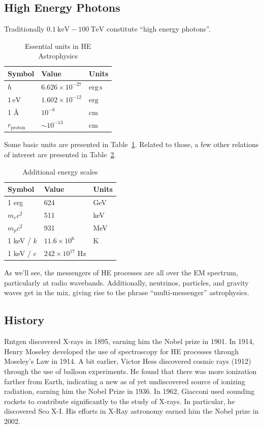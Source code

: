 \documentclass[10pt]{article}
\numberwithin{equation}{section}
\begin{document}
	
	\subsection{High Energy Photons} %
	\label{sub:high_energy_photons}
		Traditionally  $0.1\ \mathrm{keV} - 100\ \mathrm{TeV}$ constitute ``high energy photons''.
		\begin{table}[b]
			\centering
			\begin{tabular}{l l l}
				Symbol & Value & Units\\
				\hline
				$h$ & $6.626\times 10^{-27}$ & $\mathrm{erg\,s}$\\
				$1\,\mathrm{eV}$ & $1.602\times 10^{-12}$ & $\mathrm{erg}$\\
				1 \AA & $10^{-8}$ & cm\\
				$r_{\mathrm{proton}}$ & $\sim 10^{-13}$ & cm
			\end{tabular}
			\caption{Essential units in HE Astrophysics}
			\label{tab:1}
		\end{table}
		Some basic units are presented in Table~\ref{tab:1}. Related to those, a few other relations of interest are presented in Table~\ref{tab:2}.
		\begin{table}[b]
			\centering
			\begin{tabular}{l l l}
				Symbol & Value & Units\\
				\hline
				1 erg & 624 & GeV\\
				$m_ec^2$ & 511 & keV\\
				$m_pc^2$ & 931 & MeV\\
				1 keV / $k$ & $11.6\times 10^6$ & K\\
				1 keV / $c$ & $242\times 10^{17}$ Hz
			\end{tabular}
			\caption{Additional energy scales}
			\label{tab:2}
		\end{table}
		As we'll see, the messengers of HE processes are all over the EM spectrum, particularly at radio wavebands. Additionally, neutrinos, particles, and gravity waves get in the mix, giving rise to the phrase ``multi-messenger'' astrophysics.
	\subsection{History} %
	\label{sub:history}
		Rntgen discovered X-rays in 1895, earning him the Nobel prize in 1901. In 1914, Henry Moseley developed the use of spectroscopy for HE processes through Moseley's Law in 1914. A bit earlier, Victor Hess discovered cosmic rays (1912) through the use of balloon experiments. He found that there was more ionization farther from Earth, indicating a new as of yet undiscovered source of ionizing radiation, earning him the Nobel Prize in 1936. In 1962, Giacconi used sounding rockets to contribute significantly to the study of X-rays. In particular, he discovered Sco X-I. His efforts in X-Ray astronomy earned him the Nobel prize in 2002.\\
		
\end{document}
